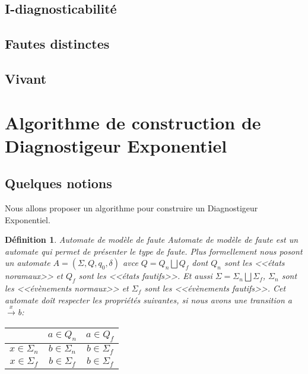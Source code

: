 \documentclass[10pt,a4paper]{article}
\newtheorem {mydef} {D\'efinition}
\begin{document}
\subsection{I-diagnosticabilit\'e}

\subsection{Fautes distinctes}

\subsection{Vivant}


\section{Algorithme de construction de Diagnostigeur Exponentiel}
        \subsection{Quelques notions}
    Nous allons proposer un algorithme pour construire un Diagnostigeur Exponentiel.
    \begin{mydef}{Automate de mod\`ele de faute}
                Automate de mod\`ele de faute est un automate qui permet de pr\'esenter le type de faute. Plus formellement nous posont un automate $A = (\Sigma, Q,q_0,\delta)$ avce $Q = Q_n \bigsqcup Q_f$ dont $Q_n$ sont les <<\'etats noramaux>> et $Q_f$ sont les <<\'etats fautifs>>. Et aussi $\Sigma = \Sigma_n \bigsqcup \Sigma_f$, $\Sigma_n$ sont les <<\'ev\`enements normaux>> et $\Sigma_f$ sont les <<\'ev\`enements fautifs>>. Cet automate do\^it respecter les propri\'et\'es suivantes, si nous avons une transition a$\xrightarrow{x}$b:
                \begin{center}
                \begin{tabular}{|c|c|c|}
                        \hline
                        & $a\in Q_n$ & $a\in Q_f$\\
                        \hline                        
                        $x\in \Sigma_n$ & $b\in \Sigma_n$&$b\in \Sigma_f$\\
                        \hline                        
                        $x\in \Sigma_f$ &$b\in \Sigma_f$&$b\in \Sigma_f$\\
                        \hline
                \end{tabular}
                \end{center}
    \end{mydef}
    
\end{document}
